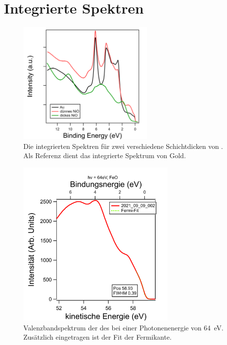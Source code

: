     \section{Integrierte Spektren}
    \label{sec:EDC}
        \begin{figure}
            \centering
            \includegraphics[width=0.6\textwidth]{./content/pictures/NiO/NiO_Filmdicke.png}
            \caption{Die integrierten Spektren für zwei verschiedene Schichtdicken von . Als Referenz dient das integrierte Spektrum von Gold.}
            \label{fig:NiO_Filmdicke}
        \end{figure}
        \begin{figure}
            \centering
            \includegraphics[width=0.7\textwidth]{./content/pictures/FeO/Fermi_FeO.png}
            \caption{Valenzbandspektrum der des  bei einer Photonenenergie von \SI{64}{\electronvolt}. Zusätzlich eingetragen ist der Fit der Fermikante.}
            \label{fig:FeO}
        \end{figure}
